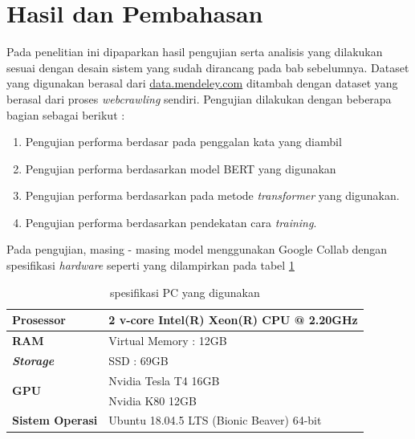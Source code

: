 \section{Hasil dan Pembahasan}
\label{sec:hasilpembahasan}

Pada penelitian ini dipaparkan hasil pengujian serta analisis yang dilakukan sesuai dengan desain sistem yang sudah dirancang pada bab sebelumnya. Dataset yang digunakan berasal dari \url{data.mendeley.com} ditambah dengan dataset yang berasal dari proses \textit{webcrawling} sendiri. Pengujian dilakukan dengan beberapa bagian sebagai berikut :

\begin{enumerate}[nolistsep]
    \item Pengujian performa berdasar pada penggalan kata yang diambil
    \item Pengujian performa berdasarkan model BERT yang digunakan
    \item Pengujian performa berdasarkan pada metode \textit{transformer} yang digunakan.
    \item Pengujian performa berdasarkan pendekatan cara \textit{training}.
\end{enumerate}

Pada pengujian, masing - masing model menggunakan Google Collab dengan spesifikasi \textit{hardware} seperti yang dilampirkan pada tabel \ref{tab:specs_collab}

\begin{table}[h]
    \caption{spesifikasi PC yang digunakan}
    \label{tab:specs_collab}
    \centering
    \begin{tabular}{|l|l|}
        \hline
        \textbf{Prosessor}            & 2 v-core Intel(R) Xeon(R) CPU @ 2.20GHz   \\ \hline
        \textbf{RAM}                  & Virtual Memory : 12GB                     \\ \hline
        \textit{\textbf{Storage}}     & SSD : 69GB                                \\ \hline
        \multirow{2}{*}{\textbf{GPU}} & Nvidia Tesla T4 16GB                      \\ \cline{2-2}
                                      & Nvidia K80 12GB                           \\ \hline
        \textbf{Sistem Operasi}       & Ubuntu 18.04.5 LTS (Bionic Beaver) 64-bit \\ \hline
    \end{tabular}
\end{table}

